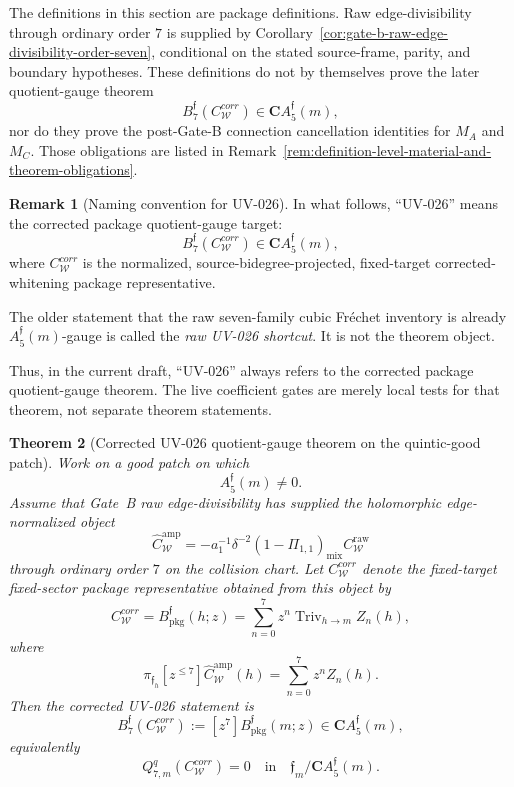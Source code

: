 \documentclass[11pt,a4paper]{amsart}
\def\corr{corr}%
\theoremstyle{plain}
\newtheorem{theorem}{Theorem}[section]
\theoremstyle{definition}
\newtheorem{remark}[theorem]{Remark}
\newcommand{\corr}{\mathrm{corr}}
\begin{document}
The definitions in this section are package definitions.  Raw
edge-divisibility through ordinary order \(7\) is supplied by
Corollary~\ref{cor:gate-b-raw-edge-divisibility-order-seven}, conditional on
the stated source-frame, parity, and boundary hypotheses.  These definitions
do not by themselves prove the later quotient-gauge theorem
\[
B_7^{\mathfrak f}(C_{\mathcal W}^{\corr})
\in
\mathbf C A_5^{\mathfrak f}(m),
\]
nor do they prove the post-Gate-B connection cancellation identities for
\(M_A\) and \(M_C\).  Those obligations are listed in
Remark~\ref{rem:definition-level-material-and-theorem-obligations}.

\begin{remark}[Naming convention for UV-026]
\label{rem:naming-convention-uv026}
In what follows, ``UV-026'' means the corrected package quotient-gauge
target:
\[
B_7^{\mathfrak f}(C_{\mathcal W}^{\corr})
\in
\mathbf C A_5^{\mathfrak f}(m),
\]
where \(C_{\mathcal W}^{\corr}\) is the normalized,
source-bidegree-projected, fixed-target corrected-whitening package
representative.

The older statement that the raw seven-family cubic Fr\'echet inventory is
already \(A_5^{\mathfrak f}(m)\)-gauge is called the \emph{raw UV-026
shortcut}.  It is not the theorem object.

Thus, in the current draft, ``UV-026'' always refers to the corrected
package quotient-gauge theorem.  The live coefficient gates are merely
local tests for that theorem, not separate theorem statements.
\end{remark}

\begin{theorem}[Corrected UV-026 quotient-gauge theorem on the quintic-good patch]
\label{thm:uv026-corrected-package-quotient-gauge}
Work on a good patch on which
\[
A_5^{\mathfrak f}(m)\ne0.
\]
Assume that Gate~B raw edge-divisibility has supplied the holomorphic
edge-normalized object
\[
\widehat C_{\mathcal W}^{\mathrm{amp}}
=
-a_1^{-1}\delta^{-2}
(1-\Pi_{1,1})_{\mathrm{mix}}
C_{\mathcal W}^{\mathrm{raw}}
\]
through ordinary order \(7\) on the collision chart.  Let
\(C_{\mathcal W}^{\corr}\) denote the fixed-target fixed-sector package
representative obtained from this object by
\[
C_{\mathcal W}^{\corr}
=
B_{\mathrm{pkg}}^{\mathfrak f}(h;z)
=
\sum_{n=0}^{7}
z^n\operatorname{Triv}_{h\to m} Z_n(h),
\]
where
\[
\pi_{\mathfrak f_h}[z^{\le7}]
\widehat C_{\mathcal W}^{\mathrm{amp}}(h)
=
\sum_{n=0}^{7}z^n Z_n(h).
\]
Then the corrected UV-026 statement is
\[
B_7^{\mathfrak f}(C_{\mathcal W}^{\corr})
:=
[z^7]B_{\mathrm{pkg}}^{\mathfrak f}(m;z)
\in
\mathbf C A_5^{\mathfrak f}(m),
\]
equivalently
\[
Q_{7,m}^q(C_{\mathcal W}^{\corr})
=
0
\quad\text{in}\quad
\mathfrak f_m/\mathbf C A_5^{\mathfrak f}(m).
\]
\end{theorem}
\end{document}
